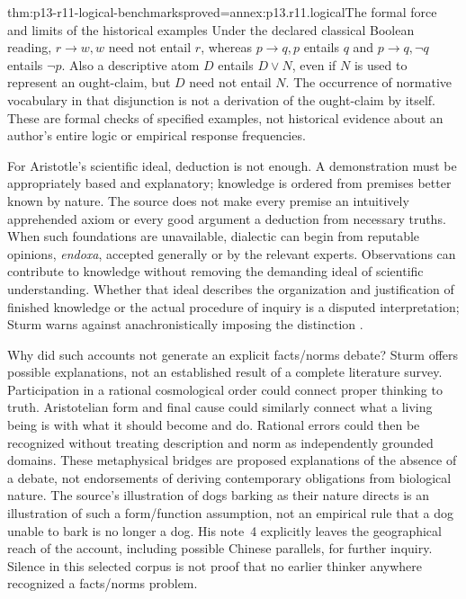 \begin{hblemma}{thm:p13-r11-logical-benchmarks}{proved=annex:p13.r11.logical}{The formal force and limits of the historical examples}
Under the declared classical Boolean reading,
\(r\to w,w\) need not entail \(r\), whereas
\(p\to q,p\) entails \(q\) and \(p\to q,\neg q\) entails \(\neg p\).
Also a descriptive atom \(D\) entails \(D\lor N\), even if
\(N\) is used to represent an ought-claim, but \(D\) need not
entail \(N\). The occurrence of normative vocabulary in that
disjunction is not a derivation of the ought-claim by itself.
These are formal checks of specified examples, not historical evidence
about an author's entire logic or empirical response frequencies.
\end{hblemma}

For Aristotle's scientific ideal, deduction is not enough. A demonstration
must be appropriately based and explanatory; knowledge is ordered from
premises better known by nature. The source does not make every premise
an intuitively apprehended axiom or every good argument a deduction from
necessary truths. When such foundations are unavailable, dialectic can
begin from reputable opinions, \emph{endoxa}, accepted generally or by
the relevant experts. Observations can contribute to knowledge without
removing the demanding ideal of scientific understanding. Whether that
ideal describes the organization and justification of finished knowledge
or the actual procedure of inquiry is a disputed interpretation; Sturm
warns against anachronistically imposing the distinction
\parencite[pp.~72--73]{Sturm2021DescriptiveNormativeHistory}.

Why did such accounts not generate an explicit facts/norms debate?
Sturm offers possible explanations, not an established result of a
complete literature survey. Participation in a rational cosmological
order could connect proper thinking to truth. Aristotelian form and
final cause could similarly connect what a living being is with what
it should become and do. Rational errors could then be recognized
without treating description and norm as independently grounded domains.
These metaphysical bridges are proposed explanations of the absence
of a debate, not endorsements of deriving contemporary obligations from
biological nature.
The source's illustration of dogs barking as their nature directs is
an illustration of such a form/function assumption, not an empirical
rule that a dog unable to bark is no longer a dog.
His note~4 explicitly leaves the geographical reach
of the account, including possible Chinese parallels, for further inquiry.
Silence in this selected corpus is not proof that no earlier thinker
anywhere recognized a facts/norms problem.

